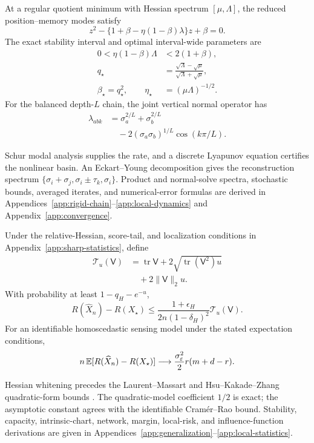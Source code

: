 \begin{theorem}
At a regular quotient minimum with Hessian spectrum
$[\mu,\Lambda]$, the reduced position--memory modes satisfy
\begin{equation}
 z^2-\{1+\beta-\eta(1-\beta)\lambda\}z+\beta=0.
\end{equation}
The exact stability interval and optimal interval-wide parameters are
\begin{align}
 0<\eta(1-\beta)\Lambda&<2(1+\beta),\\
 q_\star&=\frac{\sqrt\Lambda-\sqrt\mu}{\sqrt\Lambda+\sqrt\mu},\\
 \beta_\star=q_\star^2,\qquad
 \eta_\star&=(\mu\Lambda)^{-1/2}.
\end{align}
For the balanced depth-$L$ chain, the joint vertical normal operator has
\begin{align}
 \lambda_{abk}
 &=\sigma_a^{2/L}+\sigma_b^{2/L}\nonumber\\
 &\quad-2(\sigma_a\sigma_b)^{1/L}\cos(k\pi/L).
\end{align}
\end{theorem}
Schur modal analysis supplies the rate, and a discrete Lyapunov
equation certifies the nonlinear basin. An Eckart--Young decomposition
gives the reconstruction spectrum
$\{\sigma_i+\sigma_j,\sigma_i\pm\tau_k,\sigma_i\}$.
Product and normal-solve spectra, stochastic bounds, averaged
iterates, and numerical-error formulas are derived in
Appendices~\ref{app:rigid-chain}--\ref{app:local-dynamics}
and Appendix~\ref{app:convergence}.

\begin{theorem}
Under the relative-Hessian, score-tail, and localization conditions in
Appendix~\ref{app:sharp-statistics}, define
\begin{align}
 \mathcal T_u(\mathsf V)
 &=\operatorname{tr}\mathsf V
   +2\sqrt{\operatorname{tr}(\mathsf V^2)u}\nonumber\\
 &\quad+2\|\mathsf V\|_2u .
\end{align}
With probability at least $1-q_H-e^{-u}$,
\begin{equation}
 R(\widehat X_n)-R(X_\star)
 \leq\frac{1+\epsilon_H}{2n(1-\delta_H)^2}\mathcal T_u(\mathsf V).
\end{equation}
For an identifiable homoscedastic sensing model under the stated
expectation conditions,
\begin{equation}
 n\,\mathbb E[R(\widehat X_n)-R(X_\star)]
 \longrightarrow \frac{\sigma_\varepsilon^2}{2}r(m+d-r).
\end{equation}
\end{theorem}
Hessian whitening precedes the Laurent--Massart and
Hsu--Kakade--Zhang quadratic-form bounds
\citep{laurent2000adaptive,hsu2012tail}.
The quadratic-model coefficient $1/2$ is exact; the asymptotic constant
agrees with the identifiable Cram\'er--Rao bound.
Stability, capacity, intrinsic-chart, network, margin, local-risk,
and influence-function derivations are given in
Appendices~\ref{app:generalization}--\ref{app:local-statistics}.

